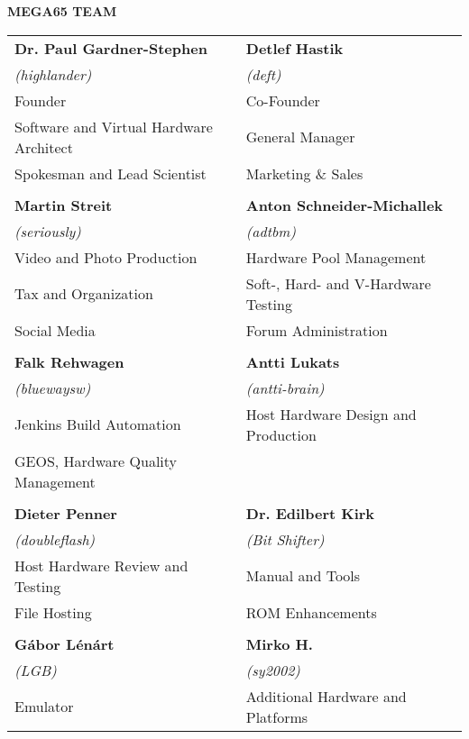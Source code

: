 \newpage
{\Huge\bfseries MEGA65 TEAM} \\[6mm]
\setlength{\tabcolsep}{1mm}
\begin{tabular}{ll}

{\large\bf Dr. Paul Gardner-Stephen}    & {\large\bf Detlef Hastik} \\
\textit{(highlander)}                   & \textit{(deft)} \\
Founder                                 & Co-Founder \\
Software and Virtual Hardware Architect & General Manager \\
Spokesman and Lead Scientist            & Marketing \& Sales \\
& \\
{\large\bf Martin Streit}               & {\large\bf Anton Schneider-Michallek} \\
 \textit{(seriously)}                   & \textit{(adtbm)} \\
Video and Photo Production              & Hardware Pool Management \\
Tax and Organization                    & Soft-, Hard- and V-Hardware Testing \\
Social Media                            & Forum Administration \\
& \\
{\large\bf Falk Rehwagen}               & {\large\bf Antti Lukats} \\
 \textit{(bluewaysw)}                   & \textit{(antti-brain)} \\
Jenkins Build Automation                & Host Hardware Design and Production \\
GEOS, Hardware Quality Management       & \\
& \\
{\large\bf Dieter Penner}               & {\large\bf Dr. Edilbert Kirk} \\
 \textit{(doubleflash)}                 & \textit{(Bit Shifter)} \\
Host Hardware Review and Testing        & Manual and Tools \\
File Hosting                            & ROM Enhancements \\
& \\
{\large\bf Gábor Lénárt}                & {\large\bf Mirko H.} \\
 \textit{(LGB)}                         & \textit{(sy2002)} \\
Emulator                                & Additional Hardware and Platforms \\

\end{tabular}
